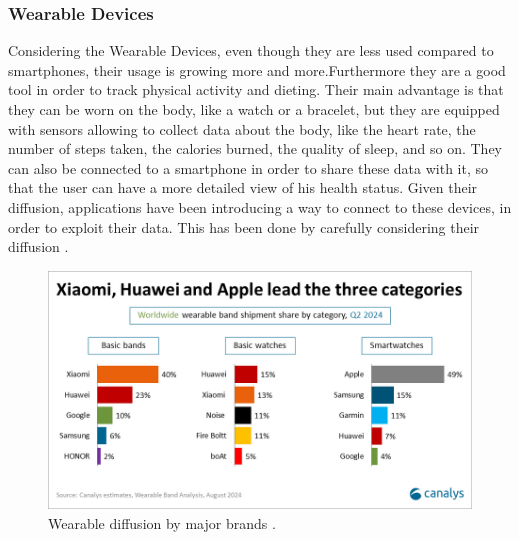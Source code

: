 \subsubsection{Wearable Devices} %
Considering the Wearable Devices, even though they are less used compared to smartphones, their usage is growing more and more.Furthermore they are a good tool in order to track physical activity and dieting. Their main advantage is that they can be worn on the body, like a watch or a bracelet, but they are equipped with sensors allowing to collect data about the body, like the heart rate, the number of steps taken, the calories burned, the quality of sleep, and so on. They can also be connected to a smartphone in order to share these data with it, so that the user can have a more detailed view of his health status. Given their diffusion, applications have been introducing a way to connect to these devices, in order to exploit their data. This has been done by carefully considering their diffusion \cite{WearableDevicesBrandDiffusion}.
\begin{figure}
    \includegraphics[width=1.0\linewidth]{./images/wearable_brand_diffusion.png}
    \caption[Wearable diffusion by major brands.]{Wearable diffusion by major brands \protect\cite{WearableDevicesBrandDiffusion}.}
    \label{fig:brandDiffusion}
\end{figure}
\FloatBarrier
